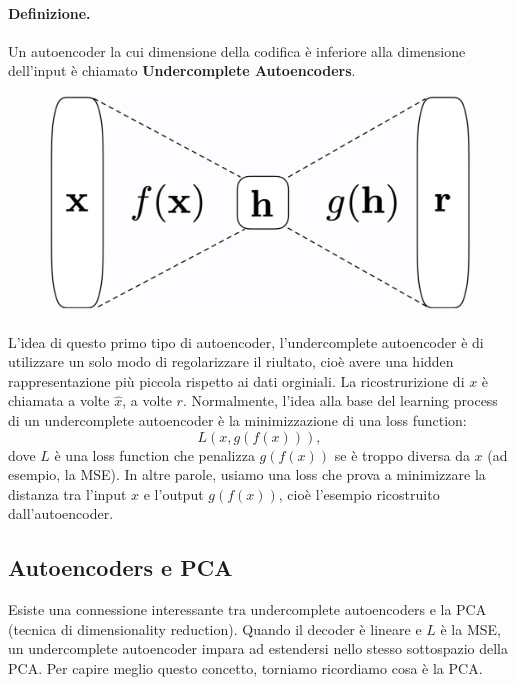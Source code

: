 \paragraph{Definizione.} Un autoencoder la cui dimensione della codifica è inferiore alla dimensione dell'input
è chiamato \textbf{Undercomplete Autoencoders}.
\begin{figure}[!h]
  \centering
  \includegraphics[scale=.4]{images/autoencoders/undercomplete.png}
\end{figure}


L'idea di questo primo tipo di autoencoder, l'undercomplete autoencoder è di utilizzare un solo modo di 
regolarizzare il riultato, cioè avere una hidden rappresentazione più piccola rispetto ai dati orginiali. 
La ricostrurizione di $x$ è chiamata a volte $\hat{x}$, a volte $r$.
\newline
\newline
Normalmente, l'idea alla base del learning process di un undercomplete autoencoder è la minimizzazione di una
loss function:
\begin{equation}
  L(x,g(f(x))),
\end{equation}
dove $L$ è una loss function che penalizza $g(f(x))$ se è troppo diversa da $x$ (ad esempio, la MSE).
In altre parole, usiamo una loss che prova a minimizzare la distanza tra l'input $x$ e l'output $g(f(x))$, 
cioè l'esempio ricostruito dall'autoencoder. 

\newpage
\subsection{Autoencoders e PCA} 
Esiste una connessione interessante tra undercomplete autoencoders e la PCA (tecnica di dimensionality 
reduction). Quando il decoder è lineare e $L$ è la MSE, un undercomplete autoencoder impara ad estendersi 
nello stesso sottospazio della PCA. Per capire meglio questo concetto, torniamo ricordiamo cosa è la PCA.

